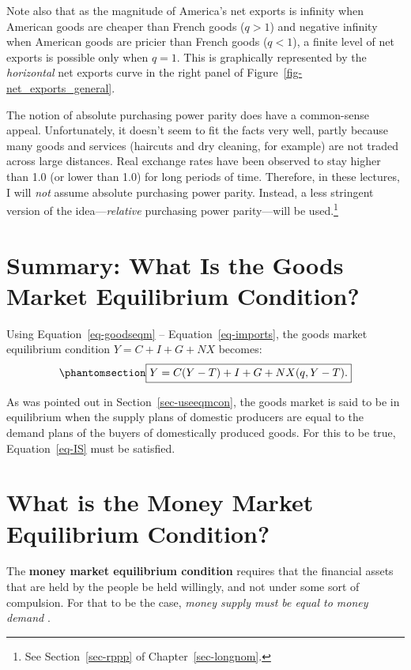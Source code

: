 \documentclass[
  letterpaper,
]{book}
\theoremstyle{plain}
\theoremstyle{remark}
\begin{document}
Note also that as the magnitude of America's net exports is infinity
when American goods are cheaper than French goods (\(q>1\)) and negative
infinity when American goods are pricier than French goods (\(q<1\)), a
finite level of net exports is possible only when \(q=1\). This is
graphically represented by the \emph{horizontal} net exports curve in
the right panel of Figure~\ref{fig-net_exports_general}.

The notion of absolute purchasing power parity does have a common-sense
appeal. Unfortunately, it doesn't seem to fit the facts very well,
partly because many goods and services (haircuts and dry cleaning, for
example) are not traded across large distances. Real exchange rates have
been observed to stay higher than 1.0 (or lower than 1.0) for long
periods of time. Therefore, in these lectures, I will \emph{not} assume
absolute purchasing power parity. Instead, a less stringent version of
the idea---\emph{relative} purchasing power parity---will be
used.\footnote{See Section~\ref{sec-rppp} of Chapter~\ref{sec-longnom}.
  }

\section{Summary: What Is the Goods Market Equilibrium
Condition?}\label{sec-summary-goodseqm}

Using Equation~\ref{eq-goodseqm} -- Equation~\ref{eq-imports}, the goods
market equilibrium condition \(Y=C+I+G+NX\) becomes:
\begin{equation}\phantomsection\label{eq-IS}{
\fbox{$\displaystyle Y=C(Y-T)+I+G+NX(q,Y-T).$}
}\end{equation}

As was pointed out in Section~\ref{sec-useeqmcon}, the goods market is
said to be in equilibrium when the supply plans of domestic producers
are equal to the demand plans of the buyers of domestically produced
goods. For this to be true, Equation~\ref{eq-IS} must be satisfied.

\section{What is the Money Market Equilibrium
Condition?}\label{sec-moneyeqm}

The \textbf{money market equilibrium condition} 
requires that the financial assets that are held by the people be held
willingly, and not under some sort of compulsion. For that to be the
case, \emph{money supply must be equal to money demand}
.
\end{document}
